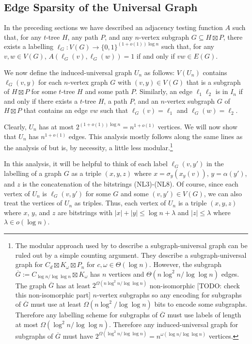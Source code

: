 \documentclass{patmorin}
\begin{document}
\subsection{Edge Sparsity of the Universal Graph}

In the preceding sections we have described an adjacency testing function $A$ such that, for any $t$-tree $H$, any path $P$, and any $n$-vertex subgraph $G\subseteq H\boxtimes P$, there exists a labelling $\ell_G:V(G)\to\{0,1\}^{(1+o(1))\log n}$ such that, for any $v,w\in V(G)$, $A(\ell_G(v),\ell_G(w))=1$ if and only if $vw\in E(G)$.

We now define the induced-universal graph $U_n$ as follows: $V(U_n)$ contains $\ell_G(v,y)$ for each $n$-vertex graph $G$ with $(v,y)\in V(G)$ that is a subgraph of $H\boxtimes P$ for some $t$-tree $H$ and some path $P$.  Similarly, an edge $\ell_1\ell_2$ is in $I_n$ if and only if there exists a $t$-tree $H$, a path $P$, and an $n$-vertex subgraph $G$ of $H\boxtimes P$ that contains an edge $vw$ such that $\ell_G(v)=\ell_1$ and $\ell_G(w)=\ell_2$.

Clearly, $U_n$ has at most $2^{(1+o(1))\log n}=n^{1+o(1)}$ vertices.  We will now show that $U_n$ has $n^{1+o(1)}$ edges.  This analysis mostly follows along the same lines as the analysis of \citet{esperet.joret.ea:sparse} but is, by necessity, a little less modular.\footnote{The modular approach used by \citet{esperet.joret.ea:sparse} to describe a subgraph-universal graph can be ruled out by a simple counting argument.  They describe a subgraph-universal graph for $C_d\boxtimes K_\omega\boxtimes P_n$ for $c,\omega\in\Theta(\log n)$.  However, the subgraph $\overline{G}:=C_{\log n/\log\log n}\boxtimes K_\omega$ has $n$ vertices and $\Theta(n\log^2 n/\log\log n)$ edges.  The graph $\overline{G}$ has at least $2^{\Omega(n\log^2 n/\log\log n)}$ non-isomorphic [TODO: check this non-isomorphic part] $n$-vertex subgraphs so any encoding for subgraphs of $\overline{G}$ must use at least $\Omega(n\log^2/\log\log n)$ bits to encode some subgraphs.  Therefore any labelling scheme for subgraphs of $\overline{G}$ must use labels of length at most $\Omega(\log^2 n/\log\log n)$.  Therefore any induced-universal graph for subgraphs of $\overline{G}$ must have $2^{\Omega(\log^2 n/\log\log n)}=n^{\omega(\log n/\log\log n)}$ vertices.}

In this analysis, it will be helpful to think of each label $\ell_G(v,y')$ in the labelling of a graph $G$ as a triple $(x,y,z)$ where $x=\sigma_y(x_y(v))$, $y=\alpha(y')$, and $z$ is the concatenation of the bitstrings (NL3)-(NL8). Of course, since each vertex of $U_n$ is $\ell_G(v,y')$ for some $G$ and some $(v,y')\in V(G)$, we can also treat the vertices of $U_n$ as triples.  Thus, each vertex of $U_n$ is a triple $(x,y,z)$ where $x$, $y$, and $z$ are bitstrings with  $|x|+|y|\le \log n + \lambda$ and $|z|\le \lambda$ where $\lambda\in o(\log n)$.
\end{document}
